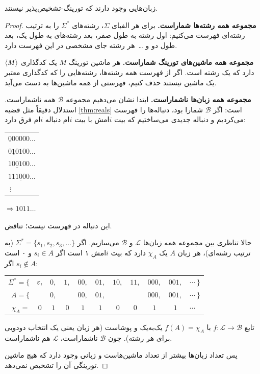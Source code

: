 \begin{corollary}\label{cor:non-rec}
زبان‌هایی وجود دارند که تورینگ-تشخیص‌پذیر نیستند.
\end{corollary}
\begin{proof}
\textbf{مجموعه همه رشته‌ها شماراست.} برای هر الفبای $\Sigma$، رشته‌های $\Sigma^*$ را به ترتیب رشته‌ای فهرست می‌کنیم: اول رشته به طول صفر، بعد رشته‌های به طول یک، بعد طول دو و \dots\ هر رشته جای مشخصی در این فهرست دارد.

\textbf{مجموعه همه ماشین‌های تورینگ شماراست.} هر ماشین تورینگ $M$ یک کدگذاری $\langle M\rangle$ دارد که یک رشته است. اگر از فهرست همه رشته‌ها، رشته‌هایی را که کدگذاری معتبر یک ماشین نیستند حذف کنیم، فهرستی از همه ماشین‌ها به دست می‌آید.

\textbf{مجموعه همه زبان‌ها ناشماراست.} ابتدا نشان می‌دهیم مجموعه $\mathcal{B}$ همه  ناشماراست. استدلال دقیقاً مثل قضیه \ref{thm:reals} است: اگر $\mathcal{B}$ شمارا بود، دنباله‌ها را فهرست می‌کردیم و دنباله جدیدی می‌ساختیم که بیت $i$امش با بیت $i$ام دنباله $i$ام فرق دارد:
\begin{ltrfig}
\begin{tabular}{l}
$\underline{0}00000\ldots$\\
$0\underline{1}0100\ldots$\\
$10\underline{0}100\ldots$\\
$111\underline{0}00\ldots$\\
$\ \vdots$
\end{tabular}
\qquad$\Longrightarrow$\qquad $1011\ldots$
\end{ltrfig}
این دنباله در فهرست نیست؛ تناقض.

حالا تناظری بین مجموعه همه زبان‌ها $\mathcal{L}$ و $\mathcal{B}$ می‌سازیم. اگر $\Sigma^*=\{s_1,s_2,s_3,\dots\}$ (به ترتیب رشته‌ای)، هر زبان $A$ یک  $\chi_A$ دارد که بیت $i$امش ۱ است اگر $s_i\in A$ و ۰ است اگر $s_i\notin A$:
\begin{ltrfig}
\begin{tabular}{rcccccccccl}
$\Sigma^*=\{$ & $\varepsilon,$ & $0,$ & $1,$ & $00,$ & $01,$ & $10,$ & $11,$ & $000,$ & $001,$ & $\cdots\ \}$\\
$A=\{$ & & $0,$ & & $00,$ & $01,$ & & & $000,$ & $001,$ & $\cdots\ \}$\\
$\chi_A=$ & $0$ & $1$ & $0$ & $1$ & $1$ & $0$ & $0$ & $1$ & $1$ & $\cdots$
\end{tabular}
\end{ltrfig}
تابع $f:\mathcal{L}\to\mathcal{B}$ با $f(A)=\chi_A$ یک‌به‌یک و پوشاست (هر زبان یعنی یک انتخاب دودویی برای هر رشته). چون $\mathcal{B}$ ناشماراست، $\mathcal{L}$ هم ناشماراست.

پس تعداد زبان‌ها بیشتر از تعداد ماشین‌هاست و زبانی وجود دارد که هیچ ماشین تورینگی آن را تشخیص نمی‌دهد.
\end{proof}

